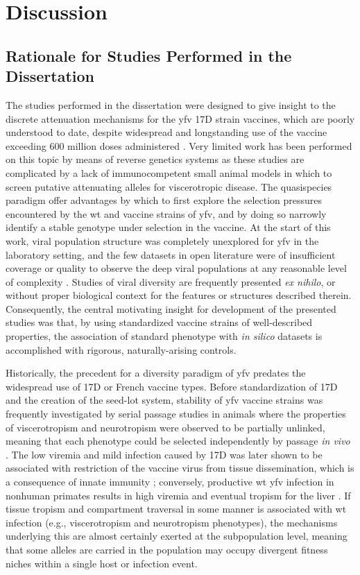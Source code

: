 \chapter{Discussion}

\section{Rationale for Studies Performed in the Dissertation}
The studies performed in the dissertation were designed to give insight to the discrete attenuation mechanisms for the \gls{yfv} 17D strain vaccines, which are poorly understood to date, despite widespread and longstanding use of the vaccine exceeding 600 million doses administered \parencite{Monath:2013cu}. Very limited work has been performed on this topic by means of reverse genetics systems as these studies are complicated by a lack of immunocompetent small animal models in which to screen putative attenuating alleles for viscerotropic disease. The quasispecies paradigm offer advantages by which to first explore the selection pressures encountered by the \gls{wt} and vaccine strains of \gls{yfv}, and by doing so narrowly identify a stable genotype under selection in the vaccine.  At the start of this work, viral population structure was completely unexplored for \gls{yfv} in the laboratory setting, and the few datasets in open literature were of insufficient coverage or quality to observe the deep viral populations at any reasonable level of complexity \parencite{Victoria:2010kf}. 
Studies of viral diversity are frequently presented \emph{ex nihilo}, or without proper biological context for the features or structures described therein. Consequently, the central motivating insight for development of the presented studies was that, by using standardized vaccine strains of well-described properties, the association of standard phenotype with \emph{in silico} datasets is accomplished with rigorous, naturally-arising controls.  

Historically, the precedent for a diversity paradigm of \gls{yfv} predates the widespread use of 17D or French vaccine types. Before standardization of 17D and the creation of the seed-lot system, stability of \gls{yfv} vaccine strains was frequently investigated by serial passage studies in animals where the properties of viscerotropism and neurotropism were observed to be partially unlinked, meaning that each phenotype could be selected independently by passage \emph{in vivo} \parencite{FINDLAY:1935vu}. The low viremia and mild infection caused by 17D was later shown to be associated with restriction of the vaccine virus from tissue dissemination, which is a consequence of innate immunity \parencite{Erickson:2013kv}; conversely, productive \gls{wt} \gls{yfv} infection in nonhuman primates results in high viremia and eventual tropism for the liver \parencite{Monath:1981tc}.  If tissue tropism and compartment traversal in some manner is associated with \gls{wt} infection (e.g., viscerotropism and neurotropism phenotypes), the mechanisms underlying this are almost certainly exerted at the subpopulation level, meaning that some alleles are carried in the population may occupy divergent fitness niches within a single host or infection event.

